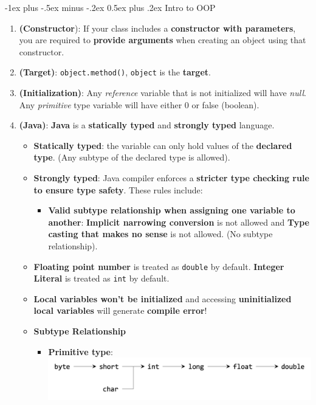 \documentclass[10pt, landscape]{article}
\makeatletter
\renewcommand{\section}{\@startsection{section}{1}{0mm}%
                                {-1ex plus -.5ex minus -.2ex}%
                                {0.5ex plus .2ex}%
                                {\normalfont\large\bfseries}}
\makeatother
\begin{document}
\begin{multicols}{4}
\section{Intro to OOP}
\begin{enumerate}
    \item \textbf{(Constructor}): If your class includes a \textbf{constructor with parameters}, you are required to \textbf{provide arguments} when creating an object using that constructor.
    \item \textbf{(Target)}: \texttt{object.method()}, \texttt{object} is the \textbf{target}.
    \item \textbf{(Initialization)}: Any \textit{reference} variable that is not initialized will have \textit{null}. Any \textit{primitive} type variable will have either 0 or false (boolean).
    \item \textbf{(Java)}: \textbf{Java} is a \textbf{statically typed} and \textbf{strongly typed} language.
    \begin{itemize}
        \item \textbf{Statically typed}: the variable can only hold values of the \textbf{declared type}. (Any subtype of the declared type is allowed).
        \item \textbf{Strongly typed}: Java compiler enforces a \textbf{stricter type checking rule to ensure type safety}. These rules include:
        \begin{itemize}
            \item \textbf{Valid subtype relationship when assigning one variable to another}: \textbf{Implicit narrowing conversion} is not allowed and \textbf{Type casting that makes no sense} is not allowed. (No subtype relationship).
        \end{itemize}
        \item \textbf{Floating point number} is treated as \texttt{double} by default. \textbf{Integer Literal} is treated as \texttt{int} by default.
        \item \textbf{Local variables won't be initialized} and accessing \textbf{uninitialized local variables} will generate \textbf{compile error}!
        \item \textbf{Subtype Relationship}
        \begin{itemize}
            \item \textbf{Primitive type}: \\
            \includegraphics[width=1\linewidth]{Paper/Midterm/images/midterm-1.png}

\end{itemize}
\end{itemize}
\end{enumerate}
\end{multicols}
\end{document}
